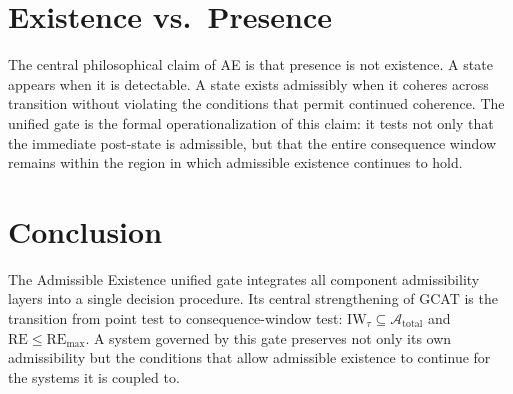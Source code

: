 \documentclass[letterpaper,10pt,conference]{ieeeconf}
\newcommand{\Atot}{\mathcal{A}_{\text{total}}}
\newcommand{\IW}{\mathrm{IW}}
\newcommand{\RE}{\mathrm{RE}}
\begin{document}
\section{Existence vs.\ Presence}

The central philosophical claim of AE is that presence is not existence. A state appears when it is detectable. A state exists admissibly when it coheres across transition without violating the conditions that permit continued coherence. The unified gate is the formal operationalization of this claim: it tests not only that the immediate post-state is admissible, but that the entire consequence window remains within the region in which admissible existence continues to hold.

\section{Conclusion}

The Admissible Existence unified gate integrates all component admissibility layers into a single decision procedure. Its central strengthening of GCAT is the transition from point test to consequence-window test: $\IW_\tau \subseteq \Atot$ and $\RE \le \RE_{\max}$. A system governed by this gate preserves not only its own admissibility but the conditions that allow admissible existence to continue for the systems it is coupled to.
\end{document}
